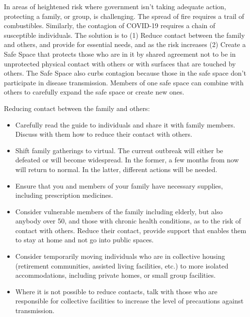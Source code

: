 \documentclass[onecolumn,journal]{IEEEtran}
\begin{document}
\begin{multicols}{2}


In areas of heightened risk where government isn't taking adequate action, protecting a family, or group, is challenging. The spread of fire requires a trail of combustibles. Similarly, the contagion of COVID-19 requires a chain of susceptible individuals. The solution is to (1) Reduce contact between the family and others, and provide for essential needs, and as the risk increases (2) Create a Safe Space that protects those who are in it by shared agreement not to be in unprotected physical contact with others or with surfaces that are touched by others. The Safe Space also curbs contagion because those in the safe space don't participate in disease transmission. Members of one safe space can combine with others to carefully expand the safe space or create new ones.

Reducing contact between the family and others:

\begin{itemize}
\item Carefully read the guide to individuals and share it with family members. Discuss with them how to reduce their contact with others.

\item Shift family gatherings to virtual. The current outbreak will either be defeated or will become widespread. In the former, a few months from now will return to normal.  In the latter, different actions will be needed. 

\item Ensure that you and members of your family have necessary supplies, including prescription medicines.

\item Consider vulnerable members of the family including elderly, but also anybody over 50, and those with chronic health conditions, as to the risk of contact with others. Reduce their contact, provide support that enables them to stay at home and not go into public spaces.

\item Consider temporarily moving individuals who are in collective housing (retirement communities, assisted living facilities, etc.) to more isolated accommodations, including private homes, or small group facilities. 

\item Where it is not possible to reduce contacts, talk with those who are responsible for collective facilities to increase the level of precautions against transmission. 


\end{itemize}
\end{multicols}
\end{document}
